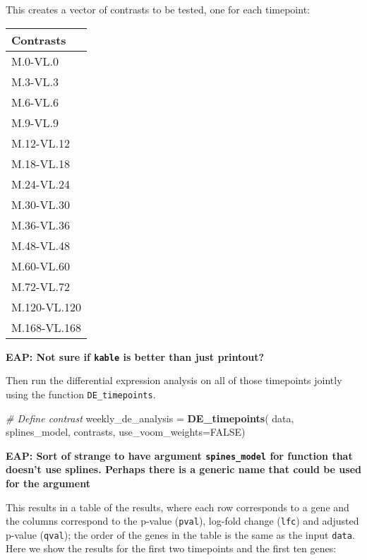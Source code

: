 \documentclass[9pt,a4paper,]{extarticle}
\newenvironment{Shaded}{\begin{snugshade}}{\end{snugshade}}
\newcommand{\CommentTok}[1]{\textcolor[rgb]{0.56,0.35,0.01}{\textit{#1}}}
\newcommand{\DataTypeTok}[1]{\textcolor[rgb]{0.13,0.29,0.53}{#1}}
\newcommand{\KeywordTok}[1]{\textcolor[rgb]{0.13,0.29,0.53}{\textbf{#1}}}
\newcommand{\NormalTok}[1]{#1}
\newcommand{\OtherTok}[1]{\textcolor[rgb]{0.56,0.35,0.01}{#1}}
\newcommand{\StringTok}[1]{\textcolor[rgb]{0.31,0.60,0.02}{#1}}
\begin{document}
This creates a vector of contrasts to be tested, one for each timepoint:

\begin{tabular}{l}
\hline
Contrasts\\
\hline
M.0-VL.0\\
\hline
M.3-VL.3\\
\hline
M.6-VL.6\\
\hline
M.9-VL.9\\
\hline
M.12-VL.12\\
\hline
M.18-VL.18\\
\hline
M.24-VL.24\\
\hline
M.30-VL.30\\
\hline
M.36-VL.36\\
\hline
M.48-VL.48\\
\hline
M.60-VL.60\\
\hline
M.72-VL.72\\
\hline
M.120-VL.120\\
\hline
M.168-VL.168\\
\hline
\end{tabular}

\textbf{EAP: Not sure if \texttt{kable} is better than just printout?}

Then run the differential expression analysis on all of those timepoints
jointly using the function \texttt{DE\_timepoints}.

\begin{Shaded}
\begin{Highlighting}[]
\CommentTok{# Define contrast   }
\NormalTok{weekly_de_analysis =}\StringTok{ }\KeywordTok{DE_timepoints}\NormalTok{(}
\NormalTok{     data, splines_model, contrasts,}
     \DataTypeTok{use_voom_weights=}\OtherTok{FALSE}\NormalTok{)}
\end{Highlighting}
\end{Shaded}

\textbf{EAP: Sort of strange to have argument \texttt{spines\_model} for function that doesn't use splines. Perhaps there is a generic name that could be used for the argument}

This results in a table of the results, where each row corresponds to a gene
and the columns correspond to the p-value (\texttt{pval}), log-fold change (\texttt{lfc})
and adjusted p-value (\texttt{qval}); the order of the genes in the table is the same
as the input \texttt{data}. Here we show the results for the first two timepoints and
the first ten genes:
\end{document}
